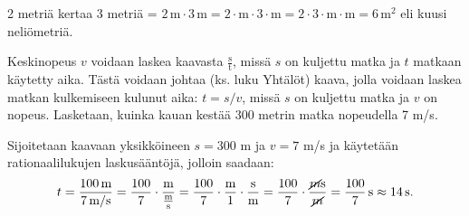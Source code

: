 \begin{esimerkki}
2 metriä kertaa 3 metriä = $2\,\text{m} \cdot 3\,\text{m} = 2 \cdot \text{m} \cdot 3 \cdot \text{m}= 2 \cdot 3 \cdot \text{m} \cdot \text{m} =6\,\text{m}^2$ eli kuusi neliömetriä.
\end{esimerkki}

%
%
%	
%

%
%
%	


\begin{esimerkki}
Keskinopeus $v$ voidaan laskea kaavasta $\frac{\text{s}}{\text{t}}$, missä $s$ on kuljettu matka ja $t$ matkaan käytetty aika. Tästä voidaan johtaa (ks. luku Yhtälöt) kaava, jolla voidaan laskea matkan kulkemiseen kulunut aika: $t=s/v$, missä $s$ on kuljettu matka ja $v$ on nopeus. Lasketaan, kuinka kauan kestää 300 metrin matka nopeudella 7 m/s.

Sijoitetaan kaavaan yksikköineen $s=300$ m ja $v= 7$ m/s ja käytetään rationaalilukujen laskusääntöjä, jolloin saadaan:
\[t=\frac{100\,\textrm{m}}{7\,\textrm{m/s}} = \frac{100}{7} \cdot \frac{\textrm{m}}{\frac{\textrm{m}}{\textrm{s}}} 
= \frac{100}{7} \cdot \frac{\textrm{m}}{1} \cdot \frac{\textrm{s}}{\textrm{m}}
= \frac{100}{7} \cdot \frac{\cancel{m}\textrm{s}}{\cancel{m}}
=\frac{100}{7}\,\textrm{s} \approx 14\,\textrm{s}.\]
\end{esimerkki}




